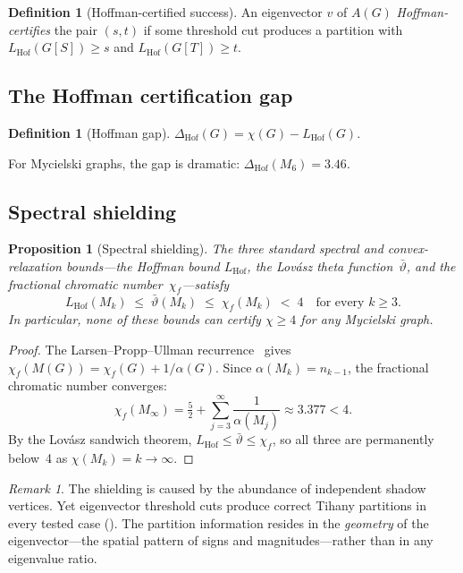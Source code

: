 \documentclass[11pt]{amsart}
\newtheorem{proposition}[theorem]{Proposition}
\theoremstyle{definition}
\newtheorem{definition}[theorem]{Definition}
\theoremstyle{remark}
\newtheorem{remark}[theorem]{Remark}
\begin{document}
\begin{definition}[Hoffman-certified success]\label{def:hoffman-cert}
An eigenvector $v$ of $A(G)$ \emph{Hoffman-certifies} the pair $(s,t)$ 
if some threshold cut produces a partition with 
$L_{\mathrm{Hof}}(G[S]) \ge s$ and $L_{\mathrm{Hof}}(G[T]) \ge t$.
\end{definition}

\subsection{The Hoffman certification gap}

\begin{definition}[Hoffman gap]\label{def:hoffman-gap}
$\Delta_{\mathrm{Hof}}(G) = \chi(G) - L_{\mathrm{Hof}}(G)$.
\end{definition}

For Mycielski graphs, the gap is dramatic: $\Delta_{\mathrm{Hof}}(M_6) = 3.46$.

\subsection{Spectral shielding}

\begin{proposition}[Spectral shielding]\label{prop:shielding}
The three standard spectral and convex-relaxation bounds---the 
Hoffman bound $L_{\mathrm{Hof}}$, the Lov\'asz theta 
function~$\bar{\vartheta}$, and the fractional chromatic 
number~$\chi_f$---satisfy
\[
  L_{\mathrm{Hof}}(M_k) \;\le\; \bar{\vartheta}(M_k) \;\le\; 
  \chi_f(M_k) \;<\; 4 \quad \text{for every } k \ge 3.
\]
In particular, none of these bounds can certify $\chi \ge 4$ for 
any Mycielski graph.
\end{proposition}

\begin{proof}
The Larsen--Propp--Ullman recurrence~\cite{larsen-propp-ullman-1995} 
gives $\chi_f(M(G)) = \chi_f(G) + 1/\alpha(G)$.  Since 
$\alpha(M_k) = n_{k-1}$, the fractional chromatic number converges:
\[
  \chi_f(M_\infty) = \tfrac{5}{2} + \sum_{j=3}^\infty 
  \frac{1}{\alpha(M_j)} \approx 3.377 < 4.
\]
By the Lov\'asz sandwich theorem, 
$L_{\mathrm{Hof}} \le \bar{\vartheta} \le \chi_f$, so all three 
are permanently below~4 as $\chi(M_k) = k \to \infty$.
\end{proof}

\begin{remark}
The shielding is caused by the abundance of independent shadow vertices.  
Yet eigenvector threshold cuts produce correct Tihany partitions in 
every tested case ().  The partition information 
resides in the \emph{geometry} of the eigenvector---the spatial 
pattern of signs and magnitudes---rather than in any eigenvalue ratio.
\end{remark}
\end{document}

